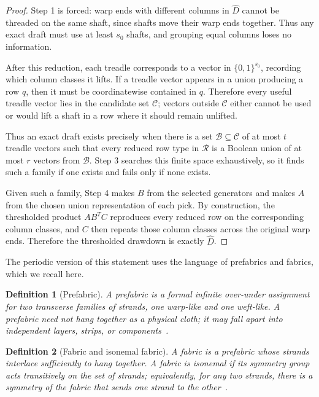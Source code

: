 \documentclass[11pt]{article}
\newtheorem{definition}{Definition}
\begin{document}
\begin{proof}
Step 1 is forced: warp ends with different columns in \(\widehat{D}\) cannot be
threaded on the same shaft, since shafts move their warp ends together. Thus
any exact draft must use at least \(s_0\) shafts, and grouping equal columns
loses no information.

After this reduction, each treadle corresponds to a vector in
\(\{0,1\}^{s_0}\), recording which column classes it lifts. If a treadle vector
appears in a union producing a row \(q\), then it must be coordinatewise
contained in \(q\). Therefore every useful treadle vector lies in the candidate
set \(\mathcal{C}\); vectors outside \(\mathcal{C}\) either cannot be used or
would lift a shaft in a row where it should remain unlifted.

Thus an exact draft exists precisely when there is a set
\(\mathcal{B}\subseteq\mathcal{C}\) of at most \(t\) treadle vectors such that
every reduced row type in \(\mathcal{R}\) is a Boolean union of at most \(r\)
vectors from \(\mathcal{B}\). Step 3 searches this finite space exhaustively, so
it finds such a family if one exists and fails only if none exists.

Given such a family, Step 4 makes \(B\) from the selected generators and makes
\(A\) from the chosen union representation of each pick. By construction, the
thresholded product \(AB^TC\) reproduces every reduced row on the corresponding
column classes, and \(C\) then repeats those column classes across the original
warp ends. Therefore the thresholded drawdown is exactly \(\widehat{D}\).
\end{proof}

The periodic version of this statement uses the language of prefabrics and
fabrics, which we recall here.

\begin{definition}[Prefabric]
A \emph{prefabric} is a formal infinite over-under assignment for two transverse
families of strands, one warp-like and one weft-like. A prefabric need not hang
together as a physical cloth; it may fall apart into independent layers, strips,
or components~\cite{grunbaum1980,clapham1980,enns1984}.
\end{definition}

\begin{definition}[Fabric and isonemal fabric]
A \emph{fabric} is a prefabric whose strands interlace sufficiently to hang
together. A fabric is \emph{isonemal} if its symmetry group acts transitively on
the set of strands; equivalently, for any two strands, there is a symmetry of
the fabric that sends one strand to the other~\cite{grunbaum1980,grunbaum1988}.
\end{definition}
\end{document}
